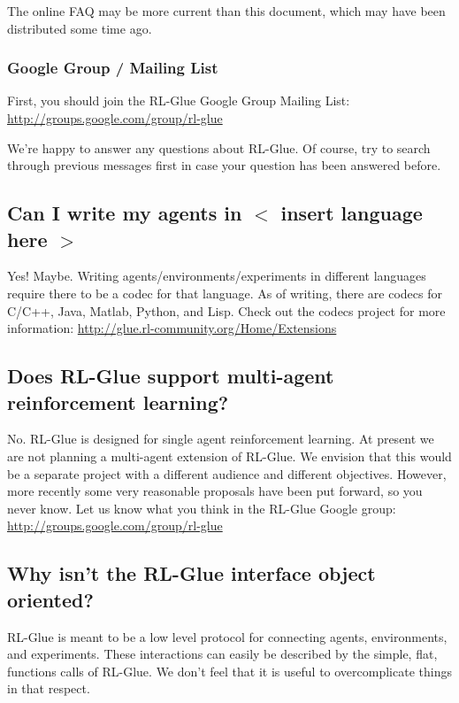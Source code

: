 \documentclass[11pt]{article}
\begin{document}
The online FAQ may be more current than this document, which may have been distributed some time ago.

\subsubsection{Google Group / Mailing List}
First, you should join the RL-Glue Google Group Mailing List:\newline
\url{http://groups.google.com/group/rl-glue}

We're happy to answer any questions about RL-Glue.  Of course, try to search through previous messages first in case your question has been answered before.


\subsection{Can I write my agents in $<$ insert language here $>$}
Yes! Maybe.  Writing agents/environments/experiments in different languages require there to be a codec for that language.  As of writing, there are codecs for C/C++, Java, Matlab, Python, and Lisp.  Check out the codecs project for more information:\newline
\url{http://glue.rl-community.org/Home/Extensions}

\subsection{Does RL-Glue support multi-agent reinforcement learning?}
 No. RL-Glue is designed for single agent reinforcement learning. At present we are not planning a multi-agent extension of RL-Glue. We envision that this would be a separate project with a different audience and different objectives.  However, more recently some very reasonable proposals have been put forward, so you never know.  Let us know what you think in the RL-Glue Google group:\newline
\url{http://groups.google.com/group/rl-glue}
 
\subsection{Why isn't the RL-Glue interface object oriented?}
RL-Glue is meant to be a low level protocol for connecting agents, environments, and experiments.  These interactions can
easily be described by the simple, flat, functions calls of RL-Glue.  We don't feel that it is useful to overcomplicate
things in that respect.
\end{document}
